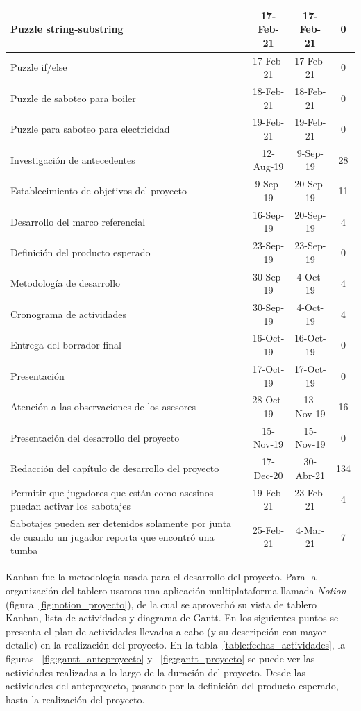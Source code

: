 \begin{longtable}[c]{|m{5cm}|c|c|c|}
\hline
Puzzle string-substring                            & 17-Feb-21 & 17-Feb-21 & 0      \\
\hline
Puzzle if/else                                     & 17-Feb-21 & 17-Feb-21 & 0      \\
\hline
Puzzle de saboteo para boiler                      & 18-Feb-21 & 18-Feb-21 & 0      \\
\hline
Puzzle para saboteo para electricidad              & 19-Feb-21 & 19-Feb-21 & 0      \\
\hline
Investigación de antecedentes                      & 12-Aug-19 & 9-Sep-19  & 28     \\
\hline
Establecimiento de objetivos del proyecto          & 9-Sep-19  & 20-Sep-19 & 11     \\
\hline
Desarrollo del marco referencial                   & 16-Sep-19 & 20-Sep-19 & 4      \\
\hline
Definición del producto esperado                   & 23-Sep-19 & 23-Sep-19 & 0      \\
\hline
Metodología de desarrollo                          & 30-Sep-19 & 4-Oct-19  & 4      \\
\hline
Cronograma de actividades                          & 30-Sep-19 & 4-Oct-19  & 4      \\
\hline
Entrega del borrador final                         & 16-Oct-19 & 16-Oct-19 & 0      \\
\hline
Presentación                                       & 17-Oct-19 & 17-Oct-19 & 0      \\
\hline
Atención a las observaciones de los asesores       & 28-Oct-19 & 13-Nov-19 & 16     \\
\hline
Presentación del desarrollo del proyecto           & 15-Nov-19 & 15-Nov-19 & 0      \\
\hline
Redacción del capítulo de desarrollo del proyecto  & 17-Dec-20 & 30-Abr-21 & 134      \\
\hline
Permitir que jugadores que están como asesinos puedan activar los sabotajes & 19-Feb-21 & 23-Feb-21 & 4 \\
\hline
Sabotajes pueden ser detenidos solamente por junta de cuando un jugador reporta que encontró una tumba & 25-Feb-21 & 4-Mar-21 & 7 \\
\hline
\end{longtable}

Kanban fue la metodología usada para el desarrollo del proyecto. Para la organización del tablero usamos una aplicación multiplataforma llamada  \textit{Notion} (figura~\ref{fig:notion_proyecto}), de la cual se aprovechó su vista de tablero Kanban, lista de actividades y diagrama de Gantt. En los siguientes puntos se presenta el plan de actividades llevadas a cabo (y su descripción con mayor detalle) en la realización del proyecto. En la tabla~\ref{table:fechas_actividades}, la figuras ~\ref{fig:gantt_anteproyecto} y ~\ref{fig:gantt_proyecto} se puede ver las actividades realizadas a lo largo de la duración del proyecto. Desde las actividades del anteproyecto, pasando por la definición del producto esperado, hasta la realización del proyecto. 

